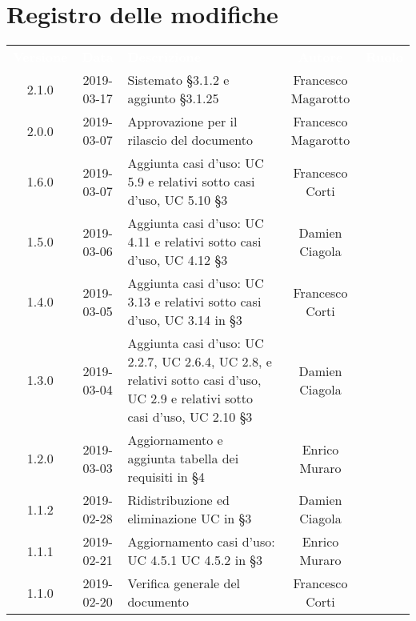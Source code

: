 \section*{Registro delle modifiche}
{
	\renewcommand{\arraystretch}{1.5}
	\centering
	\begin{longtable}{ c c C{6cm} c c }
		\textcolor{white}{\textbf{Versione}} & \textcolor{white}{\textbf{Data}} & \textcolor{white}{\textbf{Descrizione}} & \textcolor{white}{\textbf{Autore}} & \textcolor{white}{\textbf{Ruolo}}\\
		2.1.0 &
		2019-03-17 &
		Sistemato §3.1.2 e aggiunto §3.1.25 &
		Francesco Magarotto &
		\reda{} \\ 
		2.0.0 &
		2019-03-07 &
		Approvazione per il rilascio del documento &
		Francesco Magarotto &
		\Res{} \\
		
		1.6.0 &
		2019-03-07 &
		Aggiunta casi d'uso: UC 5.9 e relativi sotto casi d'uso, UC 5.10 §3 &
		Francesco Corti&
		\reda{} \\
		
		1.5.0 &
		2019-03-06 &
		Aggiunta casi d'uso: UC 4.11 e relativi sotto casi d'uso, UC 4.12 §3 &
		Damien Ciagola&
		\reda{} \\
		
		1.4.0 &
		2019-03-05 &
		Aggiunta casi d'uso: UC 3.13 e relativi sotto casi d'uso, UC 3.14 in §3 &
		Francesco Corti&
		\reda{} \\

		1.3.0 &
		2019-03-04 &
		Aggiunta casi d'uso: UC 2.2.7, UC 2.6.4, UC 2.8, e relativi sotto casi d'uso, UC 2.9 e relativi sotto casi d'uso, UC 2.10  §3 &
		Damien Ciagola&
		\reda{} \\
		
		
		1.2.0 &
		2019-03-03 &
		Aggiornamento e aggiunta tabella dei requisiti in §4 &
		Enrico Muraro&
		\reda{} \\
		
		1.1.2 &
		2019-02-28 &
		Ridistribuzione ed eliminazione UC in §3 &
		Damien Ciagola&
		\reda{} \\	
		
		
		1.1.1 &
		2019-02-21 &
		Aggiornamento casi d'uso: UC 4.5.1 UC 4.5.2 in §3 &
		Enrico Muraro&
		\reda{} \\		
				
		1.1.0 &
		2019-02-20 &
		Verifica generale del documento&
		Francesco Corti&
		\reda{} \\		
				

\end{longtable}}
